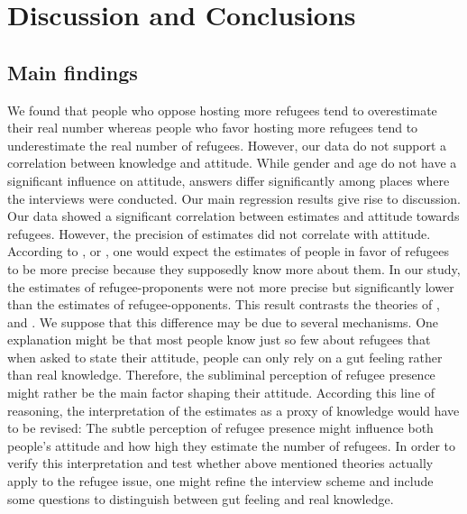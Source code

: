 \section{Discussion and Conclusions}

\subsection{Main findings}

We found that people who oppose hosting more refugees tend to overestimate their real number whereas people who favor hosting more refugees tend to underestimate the real number of refugees.
However, our data do not support a correlation between knowledge and attitude.
While gender and age do not have a significant influence on attitude, answers differ significantly among places where the interviews were conducted.
Our main regression results give rise to discussion. Our data showed a significant correlation between estimates and attitude towards refugees. However, the precision of estimates did not correlate with attitude. According to \cite{Pettigrew1997}, \cite{Pettigrew1998} or \cite{Rydgren2004}, one would expect the estimates of people in favor of refugees to be more precise because they supposedly know more about them. In our study, the estimates of refugee-proponents were not more precise but significantly lower than the estimates of refugee-opponents. This result contrasts the theories of \cite{Pettigrew1997}, \cite{Pettigrew1998} and \cite{Rydgren2004}. We suppose that this difference may be due to several mechanisms. One explanation might be that most people know just so few about refugees that when asked to state their attitude, people can only rely on a gut feeling rather than real knowledge. Therefore, the subliminal perception of refugee presence might rather be the main factor shaping their attitude. According this line of reasoning, the interpretation of the estimates as a proxy of knowledge would have to be revised: The subtle perception of refugee presence might influence both people's attitude and how high they estimate the number of refugees.
In order to verify this interpretation and test whether above mentioned theories actually apply to the refugee issue, one might refine the interview scheme and include some questions to distinguish between gut feeling and real knowledge.

